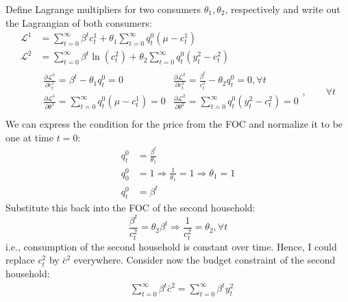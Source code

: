\documentclass[]{article}
\begin{document}
\subsubsection{}
\label{ex8.8b}
Define Lagrange multipliers for two consumers $\theta_1, \theta_2$, respectively and write out the Lagrangian of both consumers:
\begin{equation}
	\begin{split}
		\mathcal{L}^1& = \sum\limits_{t = 0}^{\infty}\beta^tc_t^1 + \theta_1\sum\limits_{t = 0}^{\infty}q_t^0(\mu - c_t^1) \\
		\mathcal{L}^2& = \sum\limits_{t = 0}^{\infty}\beta^t\ln(c_t^2) + \theta_2\sum\limits_{t = 0}^{\infty}q_t^0(y_t^2 - c_t^2) \\\nonumber
		&\begin{matrix}
			\frac{\partial\mathcal{L}^1}{\partial c_t^1} = \beta^t - \theta_1q_t^0 = 0 & \frac{\partial\mathcal{L}^2}{\partial c_t^2} = \frac{\beta^t}{c_t^2} - \theta_2q_t^0 = 0, \forall t \\
			\frac{\partial\mathcal{L}^1}{\partial\theta^1} = \sum\limits_{t = 0}^{\infty}q_t^0(\mu - c_t^1) = 0 & \frac{\partial\mathcal{L}^2}{\partial\theta^2} = \sum\limits_{t = 0}^{\infty}q_t^0(y_t^2 - c_t^2) = 0\\
		\end{matrix}, \qquad\forall t
	\end{split}
\end{equation}
We can express the condition for the price from the FOC and normalize it to be one at time $t = 0$:
\begin{equation}
	\begin{split}
		q_t^0& = \frac{\beta^t}{\theta_1} \\
		q_0^0& = 1 \Longrightarrow \frac{1}{\theta_1} = 1 \Longrightarrow \theta_1 = 1 \\
		q_t^0& = \beta^t\nonumber
	\end{split}
\end{equation}
Substitute this back into the FOC of the second household:
\begin{equation}
	\frac{\beta^t}{c_t^2} = \theta_2\beta^t \Longrightarrow \frac{1}{c_t^2} = \theta_2, \forall t \nonumber
\end{equation}
i.e., consumption of the second household is constant over time. Hence, I could replace $c_t^2$ by $\bar{c}^2$ everywhere. Consider now the budget constraint of the second household:
\begin{equation}
	\begin{split}
		&\sum\limits_{t = 0}^{\infty}\beta^t\bar{c}^2 = \sum\limits_{t = 0}^{\infty}\beta^ty_t^2 \nonumber
	\end{split}
\end{equation}
\end{document}
